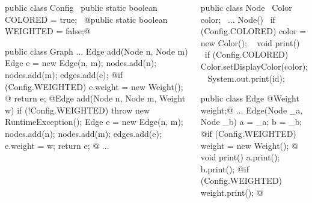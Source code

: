 \begin{frame}[fragile]{\myframetitle}
		\begin{columns}
\begin{tiny}
\begin{codetight}{}
public class Config {
	~public static boolean COLORED = true;~
	@public static boolean WEIGHTED = false;@
}
\end{codetight}
\begin{codetight}{}
public class Graph {
	...
	Edge add(Node n, Node m) {
		Edge e = new Edge(n, m);
		nodes.add(n); nodes.add(m); edges.add(e);
		@if (Config.WEIGHTED) { e.weight = new Weight(); }@
		return e;
	}
	@Edge add(Node n, Node m, Weight w) {
		if (!Config.WEIGHTED) { throw new RuntimeException(); }
		Edge e = new Edge(n, m);
		nodes.add(n); nodes.add(m); edges.add(e);
		e.weight = w;
		return e;
	}@
	...
}
\end{codetight}
\end{tiny}	
\begin{tiny}
\begin{codetight}{}
public class Node {
	~Color color;~
	...
	Node(){
		~if (Config.COLORED) { color = new Color(); }~
	}
	void print() {
		~if (Config.COLORED) { Color.setDisplayColor(color); }~
		System.out.print(id);
	}
}
\end{codetight}
\begin{codetight}{}
public class Edge {
	@Weight weight;@
	...
	Edge(Node _a, Node _b) {
		a = _a; b = _b;
		@if (Config.WEIGHTED) { weight = new Weight(); }@
	}
	void print() {
		a.print(); b.print();
		@if (Config.WEIGHTED) { weight.print(); }@
	}
}
\end{codetight}
\end{tiny}	
		\end{columns}
\end{frame}


